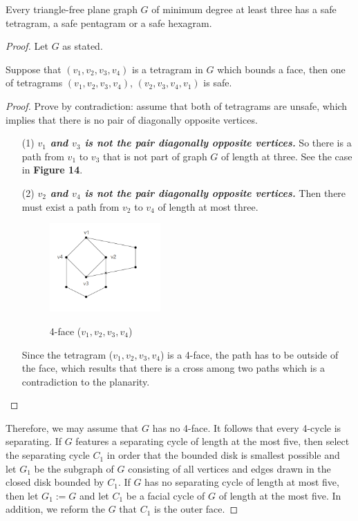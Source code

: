 \begin{lemma}
Every triangle-free plane graph $G$ of minimum degree at least three has a safe tetragram, a safe pentagram or a safe hexagram. \cite{dvorak2013threecoloring}
\end{lemma}
\begin{proof}
Let $G$ as stated. 

\begin{claim}
Suppose that $(v_1, v_2, v_3, v_4)$ is a tetragram in $G$ which bounds a face, then one of tetragrams $(v_1, v_2, v_3, v_4)$, $(v_2, v_3, v_4, v_1)$ is safe.
\end{claim}

\begin{proof}
Prove by contradiction: assume that both of tetragrams are unsafe, which implies that there is no pair of diagonally opposite vertices.
\begin{itemize}
    \item[(1)] \textit{\textbf{$v_1$ and $v_3$ is not the pair diagonally opposite vertices.}} So there is a path from $v_1$ to $v_3$ that is not part of graph $G$ of length at three. See the case in \textbf{Figure 14}.
    \item[(2)] \textit{\textbf{$v_2$ and $v_4$ is not the pair diagonally opposite vertices.}} Then there must exist a path from $v_2$ to $v_4$ of length at most three. 
    \begin{figure}[H] %
    \centering %
    \includegraphics[width=0.4\textwidth]{figure/4face.png} 
    \label{figure} %
    \caption{4-face ($v_1, v_2, v_3, v_4$)}
    \end{figure}
    Since the tetragram ($v_1, v_2, v_3, v_4$) is a 4-face, the path has to be outside of the face, which results that there is a cross among two paths which is a contradiction to the planarity.
\end{itemize}
\end{proof}
Therefore, we may assume that $G$ has no 4-face. It follows that every 4-cycle is separating. If $G$ features a separating cycle of length at the most five, then select the separating cycle $C_1$ in order that the bounded disk is smallest possible and let $G_1$ be the subgraph of $G$ consisting of all vertices and edges drawn in the closed disk bounded by $C_1$. If $G$ has no separating cycle of length at most five, then let $G_1 := G$ and let $C_1$ be a facial cycle of $G$ of length at the most five. In addition, we reform the $G$ that $C_1$ is the outer face.


\end{proof}
